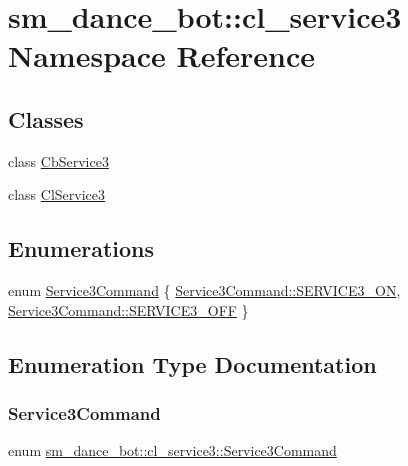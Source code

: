 \hypertarget{namespacesm__dance__bot_1_1cl__service3}{}\section{sm\+\_\+dance\+\_\+bot\+:\+:cl\+\_\+service3 Namespace Reference}
\label{namespacesm__dance__bot_1_1cl__service3}
\subsection*{Classes}
\begin{DoxyCompactItemize}
\item 
class \hyperlink{classsm__dance__bot_1_1cl__service3_1_1CbService3}{Cb\+Service3}
\item 
class \hyperlink{classsm__dance__bot_1_1cl__service3_1_1ClService3}{Cl\+Service3}
\end{DoxyCompactItemize}
\subsection*{Enumerations}
\begin{DoxyCompactItemize}
\item 
enum \hyperlink{namespacesm__dance__bot_1_1cl__service3_adbcecb84d61edff09f1fb67ef9607ac4}{Service3\+Command} \{ \hyperlink{namespacesm__dance__bot_1_1cl__service3_adbcecb84d61edff09f1fb67ef9607ac4a13cdca48a01bbb44fa8fb35567fbc58e}{Service3\+Command\+::\+S\+E\+R\+V\+I\+C\+E3\+\_\+\+ON}, 
\hyperlink{namespacesm__dance__bot_1_1cl__service3_adbcecb84d61edff09f1fb67ef9607ac4a642ed22a7f6b816840289b4256116e9e}{Service3\+Command\+::\+S\+E\+R\+V\+I\+C\+E3\+\_\+\+O\+FF}
 \}
\end{DoxyCompactItemize}


\subsection{Enumeration Type Documentation}
\mbox{\label{namespacesm__dance__bot_1_1cl__service3_adbcecb84d61edff09f1fb67ef9607ac4}} 
\subsubsection{\texorpdfstring{Service3\+Command}{Service3Command}}
{\footnotesize\ttfamily enum \hyperlink{namespacesm__dance__bot_1_1cl__service3_adbcecb84d61edff09f1fb67ef9607ac4}{sm\+\_\+dance\+\_\+bot\+::cl\+\_\+service3\+::\+Service3\+Command}\hspace{0.3cm}{\ttfamily [strong]}}

